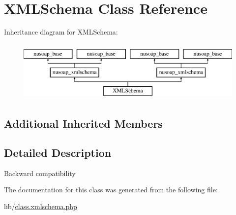\hypertarget{class_x_m_l_schema}{}\section{X\+M\+L\+Schema Class Reference}
\label{class_x_m_l_schema}
Inheritance diagram for X\+M\+L\+Schema\+:\begin{figure}[H]
\begin{center}
\leavevmode
\includegraphics[height=3.000000cm]{class_x_m_l_schema}
\end{center}
\end{figure}
\subsection*{Additional Inherited Members}


\subsection{Detailed Description}
Backward compatibility 

The documentation for this class was generated from the following file\+:\begin{DoxyCompactItemize}
\item 
lib/\hyperlink{class_8xmlschema_8php}{class.\+xmlschema.\+php}\end{DoxyCompactItemize}
